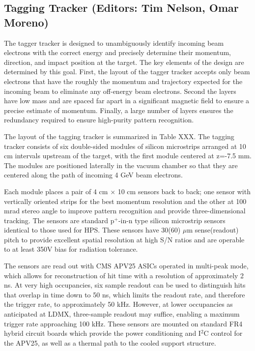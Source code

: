 \subsection{Tagging Tracker (Editors: Tim Nelson, Omar Moreno)}

The tagger tracker is designed to unambiguously identify incoming beam electrons with the correct energy and precisely determine their momentum, direction, and impact position at the target.  The key elements of the design are determined by this goal.  First, the layout of the tagger tracker accepts only beam electrons that have the roughly the momentum and trajectory expected for the incoming beam to eliminate any off-energy beam electrons.  Second the layers have low mass and are spaced far apart in a significant magnetic field to ensure a precise estimate of momentum.  Finally, a large number of layers ensures the redundancy required to ensure high-purity pattern recognition.

The layout of the tagging tracker is summarized in Table XXX. The tagging tracker consists of six double-sided modules of silicon microstrips arranged at 10 cm intervals upstream of the target, with the first module centered at z=-7.5 mm.  The modules are positioned laterally in the vacuum chamber so that they are centered along the path of incoming 4 GeV beam electrons.

Each module places a pair of 4 cm $\times$ 10 cm sensors back to back; one sensor with vertically oriented strips for the best momentum resolution and the other at 100 mrad stereo angle to improve pattern recognition and provide three-dimensional tracking. The sensors are standard p$^+$-in-n type silicon microstrip sensors identical to those used for HPS.  These sensors have 30(60) $\mu$m sense(readout) pitch to provide excellent spatial resolution at high S/N ratios and are operable to at least 350V bias for radiation tolerance.

The sensors are read out with CMS APV25 ASICs operated in multi-peak mode, which allows for reconstruction of hit time with a resolution of approximately 2 ns. At very high occupancies, six sample readout can be used to distinguish hits that overlap in time down to 50 ns, which limits the readout rate, and therefore the trigger rate, to approximately 50 kHz.  However, at lower occupancies as anticipated at LDMX, three-sample readout may suffice, enabling a maximum trigger rate approaching 100 kHz.  These sensors are mounted on standard FR4 hybrid circuit boards which provide the power conditioning and I$^2$C control for the APV25, as well as a thermal path to the cooled support structure.

